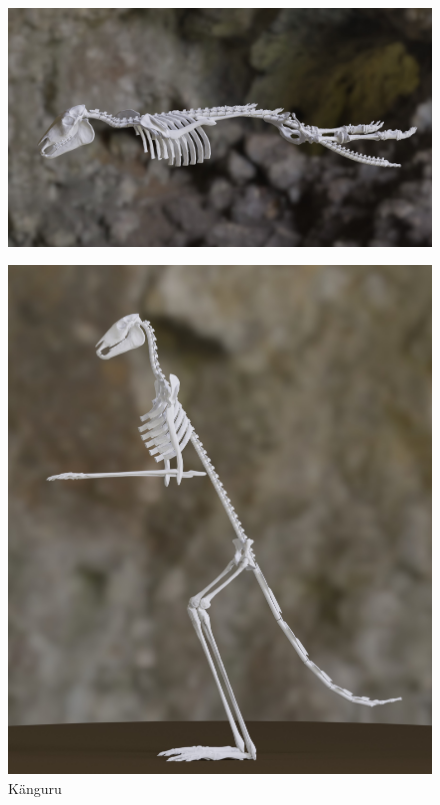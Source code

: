 \documentclass{beamer}
\begin{document}
\begin{frame}[focus]
 \begin{figure}
  \centering
  \includegraphics[width=\textwidth]{../../java_skeleton_generation/example_skeletons/fish.jpg}
 \end{figure}
\end{frame}

\begin{frame}[focus]
 \begin{figure}
  \includegraphics[height=0.8\textheight]{../../java_skeleton_generation/example_skeletons/kaenguru.jpg}
 \caption{Känguru}
 \end{figure}
\end{frame}
\end{document}
